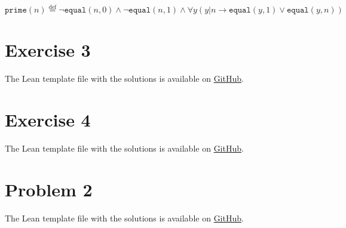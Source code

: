 \documentclass[11pt]{article}
\begin{document}
$$\texttt{prime}(n)\stackrel{\text{def}}{=} \lnot \texttt{equal}(n, 0)\land \lnot \texttt{equal}(n, 1) \land \forall y (y | n \to \texttt{equal}(y, 1) \lor \texttt{equal}(y, n))$$


\section*{Exercise 3}
The Lean template file with the solutions is available on \href{https://github.com/lucastassis/BU-CS511/blob/main/HW06/code/HW06.lean}{GitHub}.

\section*{Exercise 4}
The Lean template file with the solutions is available on \href{https://github.com/lucastassis/BU-CS511/blob/main/HW06/code/HW06.lean}{GitHub}.

\section*{Problem 2}
The Lean template file with the solutions is available on \href{https://github.com/lucastassis/BU-CS511/blob/main/HW06/code/HW06.lean}{GitHub}.
\end{document}

